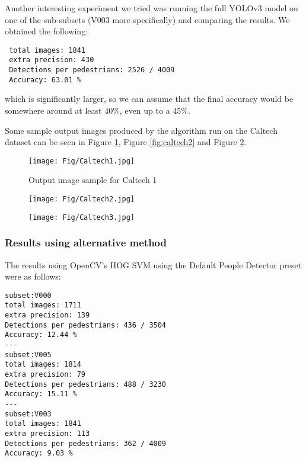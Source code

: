 \documentclass[runningheads,a4paper,11pt]{report}
\begin{document}
 Another interesting experiment we tried was running the full YOLOv3 model on one of the sub-subsets (V003 more specifically)  and comparing the results. We obtained the following:
 \begin{lstlisting}
 total images: 1841
 extra precision: 430
 Detections per pedestrians: 2526 / 4009
 Accuracy: 63.01 %
 \end{lstlisting}
 
 which is significantly larger, so we can assume that the final accuracy would be somewhere around at least 40\%, even up to a 45\%.
 
 Some sample output images produced by the algorithm run on the Caltech dataset can be seen in Figure \ref{fig:caltech1}, Figure \ref{fig:caltech2} and Figure \ref{fig:caltech3}. 

\begin{figure}[htbp]
	\centerline{\texttt{[image: Fig/Caltech1.jpg]}} 
	\caption{Output image sample for Caltech 1}
	\label{fig:caltech1}
\end{figure}
\begin{figure}
\centering
\begin{minipage}{.5\textwidth}
  \centering
  \texttt{[image: Fig/Caltech2.jpg]}
 \label{fig:caltech2}
\end{minipage}%
\begin{minipage}{.5\textwidth}
  \centering
  \texttt{[image: Fig/Caltech3.jpg]}
  \label{fig:caltech3}
\end{minipage}
\end{figure}

\subsubsection{Results using alternative method}

The results using OpenCV's HOG SVM using the Default People Detector preset were as follows:

\begin{lstlisting}
subset:V000
total images: 1711
extra precision: 139
Detections per pedestrians: 436 / 3504
Accuracy: 12.44 %
---
subset:V005
total images: 1814
extra precision: 79
Detections per pedestrians: 488 / 3230
Accuracy: 15.11 %
---
subset:V003
total images: 1841
extra precision: 113
Detections per pedestrians: 362 / 4009
Accuracy: 9.03 %
\end{lstlisting}
\end{document}
